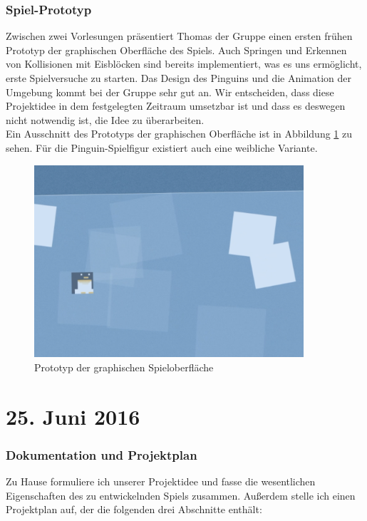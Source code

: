 \documentclass{report}
\begin{document}
\subsubsection*{Spiel-Prototyp}

Zwischen zwei Vorlesungen präsentiert Thomas der Gruppe einen ersten frühen Prototyp der graphischen Oberfläche des Spiels. Auch Springen und Erkennen von Kollisionen mit Eisblöcken sind bereits implementiert, was es uns ermöglicht, erste Spielversuche zu starten. Das Design des Pinguins und die Animation der Umgebung kommt bei der Gruppe sehr gut an. Wir entscheiden, dass diese Projektidee in dem festgelegten Zeitraum umsetzbar ist und dass es deswegen nicht notwendig ist, die Idee zu überarbeiten. \\

\noindent Ein Ausschnitt des Prototyps der graphischen Oberfläche ist in Abbildung \ref{fig:prototype} zu sehen. Für die Pinguin-Spielfigur existiert auch eine weibliche Variante.

\begin{figure}
	\center
	\includegraphics[width=100mm]{img/prototype}
	\caption{Prototyp der graphischen Spieloberfläche}
	\label{fig:prototype}
\end{figure}
\pagebreak


\section*{25. Juni 2016}

\subsubsection*{Dokumentation und Projektplan}

Zu Hause formuliere ich unserer Projektidee und fasse die wesentlichen Eigenschaften des zu entwickelnden Spiels zusammen. Außerdem stelle ich einen Projektplan auf, der die folgenden drei Abschnitte enthält:
\end{document}
